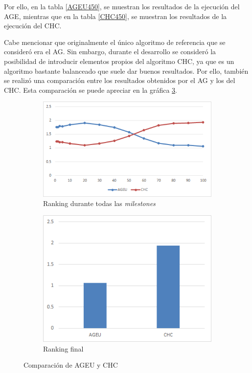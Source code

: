 Por ello, en la tabla \ref{AGEU450}, se muestran los resultados de la ejecución del AGE, mientras que en la tabla \ref{CHC450}, se muestran los resultados de la ejecución del CHC. 

Cabe mencionar que originalmente el único algoritmo de referencia que se consideró era el AG. 
Sin embargo, durante el desarrollo se consideró la posibilidad de introducir elementos propios del algoritmo CHC, ya que es un algoritmo bastante balanceado que suele dar buenos resultados. 
Por ello, también se realizó una comparación entre los resultados obtenidos por el AG y los del CHC. 
Esta comparación se puede apreciar en la gráfica \ref{fig:AGEUvsCHC}.

\begin{figure}
     \centering
     \begin{subfigure}[b]{0.45\textwidth}
         \centering
         \includegraphics[width=\textwidth]{imagenes/Experimental/AGEUvsCHC.png}
         \caption{Ranking durante todas las \textit{milestones}}
         \label{fig:AGEUvsCHC_lineas}
     \end{subfigure}
     \hfill
     \begin{subfigure}[b]{0.45\textwidth}
         \centering
         \includegraphics[width=\textwidth]{imagenes/Experimental/barras/AGEUvsCHC.png}
         \caption{Ranking final}
         \label{fig:AGEUvsCHC_barras}
     \end{subfigure}
        \caption{Comparación de AGEU y CHC}
        \label{fig:AGEUvsCHC}
\end{figure}


